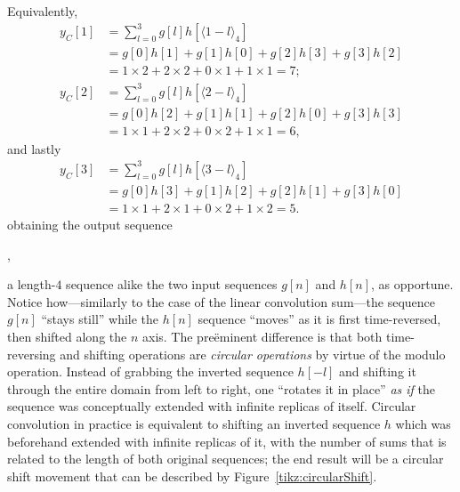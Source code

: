 \documentclass[\documentfontsize, twocolumn]{\classname}
\begin{document}
Equivalently,
\begin{align*}
    y_C[1]
    &= \sum_{l=0}^{3} g[l] h[\langle 1 -l\rangle_4] \\
    &= g[0]h[1] + g[1]h[0] + g[2]h[3] + g[3]h[2]\\
    &= 1\times 2 + 2 \times 2 + 0 \times 1 + 1 \times 1 = 7;\\
    y_C[2]
    &= \sum_{l=0}^{3} g[l] h[\langle 2 -l\rangle_4] \\
    &= g[0]h[2] + g[1]h[1] + g[2]h[0] + g[3]h[3]\\
    &= 1\times 1 + 2 \times 2 + 0 \times 2 + 1 \times 1 = 6,
\end{align*}
and lastly
\begin{align*}
    y_C[3]
    &= \sum_{l=0}^{3} g[l] h[\langle 3 -l\rangle_4] \\
    &= g[0]h[3] + g[1]h[2] + g[2]h[1] + g[3]h[0]\\
    &= 1\times 1 + 2 \times 1 + 0 \times 2 + 1 \times 2 = 5.
\end{align*}
obtaining the output sequence
\begin{center}
    ,
\end{center}
a length-$4$ sequence alike the two input sequences $g[n]$ and $h[n]$, as opportune. Notice how---similarly to the case of the linear convolution sum---the sequence $g[n]$ ``stays still'' while the $h[n]$ sequence ``moves'' as it is first time-reversed, then shifted along the $n$ axis. The pre\"eminent difference is that both time-reversing and shifting operations are \emph{circular operations} by virtue of the modulo operation. Instead of grabbing the inverted sequence $h[-l]$ and shifting it through the entire domain from left to right, one ``rotates it in place'' \emph{as if} the sequence was conceptually extended with infinite replicas of itself. Circular convolution in practice is equivalent to shifting an inverted sequence $h$ which was beforehand extended with infinite replicas of it, with the number of sums that is related to the length of both original sequences; the end result will be a circular shift movement that can be described by Figure~\ref{tikz:circularShift}.
\end{document}

